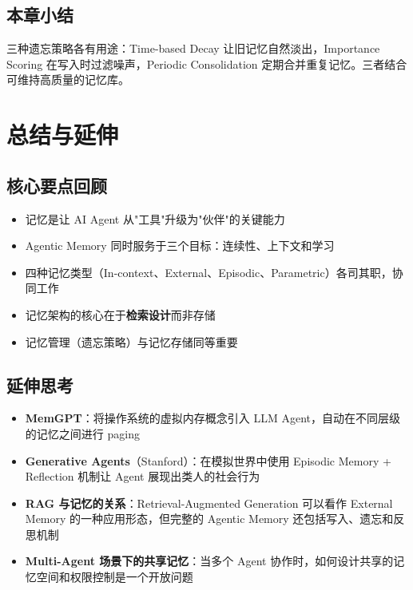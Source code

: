 \documentclass[a4paper]{article}
\begin{document}
\subsection{本章小结}

三种遗忘策略各有用途：Time-based Decay 让旧记忆自然淡出，Importance Scoring 在写入时过滤噪声，Periodic Consolidation 定期合并重复记忆。三者结合可维持高质量的记忆库。

\section{总结与延伸}

\subsection{核心要点回顾}

\begin{itemize}[leftmargin=2em]
    \item 记忆是让 AI Agent 从"工具"升级为"伙伴"的关键能力
    \item Agentic Memory 同时服务于三个目标：连续性、上下文和学习
    \item 四种记忆类型（In-context、External、Episodic、Parametric）各司其职，协同工作
    \item 记忆架构的核心在于\textbf{检索设计}而非存储
    \item 记忆管理（遗忘策略）与记忆存储同等重要
\end{itemize}

\subsection{延伸思考}

\begin{itemize}[leftmargin=2em]
    \item \textbf{MemGPT}：将操作系统的虚拟内存概念引入 LLM Agent，自动在不同层级的记忆之间进行 paging
    \item \textbf{Generative Agents}（Stanford）：在模拟世界中使用 Episodic Memory + Reflection 机制让 Agent 展现出类人的社会行为
    \item \textbf{RAG 与记忆的关系}：Retrieval-Augmented Generation 可以看作 External Memory 的一种应用形态，但完整的 Agentic Memory 还包括写入、遗忘和反思机制
    \item \textbf{Multi-Agent 场景下的共享记忆}：当多个 Agent 协作时，如何设计共享的记忆空间和权限控制是一个开放问题
\end{itemize}

\end{document}
